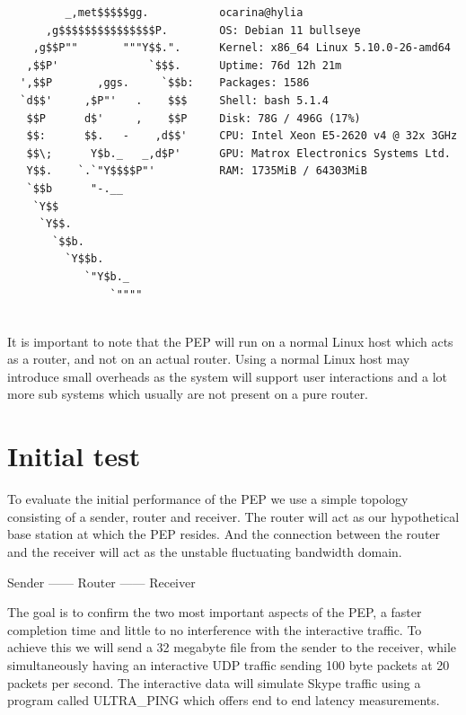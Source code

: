 \documentclass[a4paper,english, 12pt]{report}
\begin{document}
\noindent\begin{minipage}{\linewidth}
\small
\begin{verbatim}
         _,met$$$$$gg.           ocarina@hylia
      ,g$$$$$$$$$$$$$$$P.        OS: Debian 11 bullseye
    ,g$$P""       """Y$$.".      Kernel: x86_64 Linux 5.10.0-26-amd64
   ,$$P'              `$$$.      Uptime: 76d 12h 21m
  ',$$P       ,ggs.     `$$b:    Packages: 1586
  `d$$'     ,$P"'   .    $$$     Shell: bash 5.1.4
   $$P      d$'     ,    $$P     Disk: 78G / 496G (17%)
   $$:      $$.   -    ,d$$'     CPU: Intel Xeon E5-2620 v4 @ 32x 3GHz 
   $$\;      Y$b._   _,d$P'      GPU: Matrox Electronics Systems Ltd.
   Y$$.    `.`"Y$$$$P"'          RAM: 1735MiB / 64303MiB
   `$$b      "-.__
    `Y$$
     `Y$$.
       `$$b.
         `Y$$b.
            `"Y$b._
                `""""
\end{verbatim}
\end{minipage}\\

It is important to note that the PEP will run on a normal Linux host which acts as a router, and not on an actual router. Using a normal Linux host may introduce small overheads as the system will support user interactions and a lot more sub systems which usually are not present on a pure router.

\section{Initial test}
To evaluate the initial performance of the PEP we use a simple topology consisting of a sender, router and receiver. The router will act as our hypothetical base station at which the PEP resides. And the connection between the router and the receiver will act as the unstable fluctuating bandwidth domain.

\begin{center}
Sender ------ Router ------ Receiver\\
\end{center}

The goal is to confirm the two most important aspects of the PEP, a faster completion time and little to no interference with the interactive traffic. To achieve this we will send a 32 megabyte file from the sender to the receiver, while simultaneously having an interactive UDP traffic sending 100 byte packets at 20 packets per second. The interactive data will simulate Skype traffic using a program called ULTRA\_PING\cite{rahtz2023ultraping} which offers end to end latency measurements.\\
\end{document}
